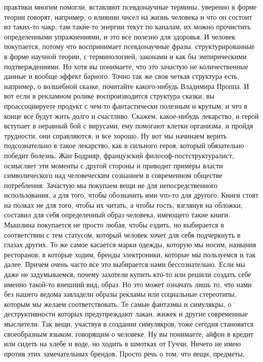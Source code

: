практики многим помогли, вставляют псевдонаучные термины, уверенно в форме
теории говорят, например, о влиянии чисел на жизнь человека и что он состоит из
таких-то чакр, там такие-то энергии текут по каналам, их можно прочистить
определенными упражнениями, и это все полезно для здоровья. И человек
покупается, потому что воспринимает псевдонаучные фразы, структурированные в
форме научной теории, с терминологией, законами и как бы эмпирическими
подтверждениями. Но хотя вы понимаете, что это зачастую не количественные данные
и вообще эффект барного. Точно так же своя четкая структура есть, например, о
волшебной сказке, почитайте какого-нибудь Владимира Проппа. И вот если в
рекламном ролике воспроизводится структура сказки, вы проассоциируете продукт с
чем-то фантастически полезным и крутым, и что в конце все будут жить долго и
счастливо. Скажем, какое-нибудь лекарство, и герой вступает в неравный бой с
вирусами, ему помогают клетки организма, и пройдя трудности, они справляются, и
все хорошо. Ну вот мы начинаем верить подсознательно в такое лекарство, как в
сильного героя, который обязательно победит болезнь. Жан Бодрияр, французский
философ-постструктуралист, осмысляет эти моменты с другой стороны и приводит
примеры власти символического над человеческим сознанием в современном обществе
потребления. Зачастую мы покупаем вещи не для непосредственного использования, а
для того, чтобы обозначить ими что-то для другого. Книги стоят на полках не для
того, чтобы их читать, а чтобы гость, взглянув на обложки, составил для себя
определенный образ человека, имеющего такие книги. Мышлина покупается не просто
любая, чтобы ездить, но выбирается в соответствии с тем статусом, который
человек хочет для себя подчеркнуть в глазах других. То же самое касается марки
одежды, которую мы носим, названия ресторанов, в которые ходим, бренды
электроники, которые мы пользуемся и так далее. Причем очень часто все это
выбирается нами бессознательно. Если мы даже не задумываемся, почему захотели
купить кто-то или решили создать себе именно такой-то внешний вид, образ. Но это
может означать лишь то, что нами без нашего ведома завладели образы рекламы или
социальные стереотипы, которым мы желаем соответствовать. Те самые фантазмы и
симулякры, о деструктивности которых предупреждают лакан, жижек и другие
современные мыслители. Так вещи, участвуя в создании симулякров, тоже сегодня
становятся своеобразным языком, говорящим о человеке. Ну вы понимаете, айфон в
кредит или сидеть на хлебе и воде, но ходить в шмотках от Гуччи. Ничего не имею
против этих замечательных брендов. Просто речь о том, что вещи, предметы,
